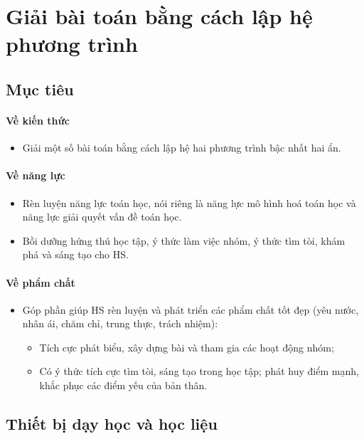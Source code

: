 \section{Giải bài toán bằng cách lập hệ phương trình}

\subsection{Mục tiêu}

\paragraph{Về kiến thức}

\begin{itemize}
	\item Giải một số bài toán bằng cách lập hệ hai phương trình bậc nhất hai ẩn.
\end{itemize}

\paragraph{Về năng lực}

\begin{itemize}
	\item Rèn luyện năng lực toán học, nói riêng là năng lực mô hình hoá toán học và năng lực giải quyết vấn đề toán học.
	\item Bồi dưỡng hứng thú học tập, ý thức làm việc nhóm, ý thức tìm tòi, khám phá và sáng tạo cho HS. 
\end{itemize}

\paragraph{Về phẩm chất}

\begin{itemize}
	\item Góp phần giúp HS rèn luyện và phát triển các phẩm chất tốt đẹp (yêu nước, nhân ái, chăm chỉ, trung thực, trách nhiệm):
	\begin{itemize}
		\item Tích cực phát biểu, xây dựng bài và tham gia các hoạt động nhóm;
		\item Có ý thức tích cực tìm tòi, sáng tạo trong học tập; phát huy điểm mạnh, khắc phục các điểm yếu của bản thân. 
	\end{itemize}
\end{itemize}

\subsection{Thiết bị dạy học và học liệu}

